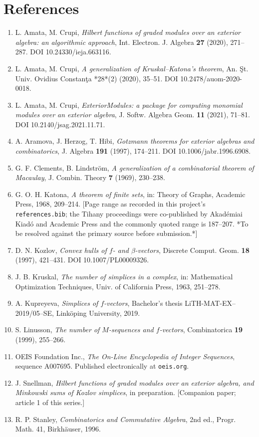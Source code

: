 \documentclass[11pt, a4paper, abstract=yes]{scrartcl}
\theoremstyle{definition}
\theoremstyle{remark}
\theoremstyle{plain}
\begin{document}
\section*{References}
\label{sec:org6385e97}
\begin{enumerate}
\item L. Amata, M. Crupi, \emph{Hilbert functions of graded modules over an exterior algebra: an algorithmic
approach}, Int. Electron. J. Algebra \textbf{27} (2020), 271--287. DOI 10.24330/ieja.663116.
\item L. Amata, M. Crupi, \emph{A generalization of Kruskal--Katona's theorem}, An. Şt. Univ. Ovidius
Constanţa *28*(2) (2020), 35--51. DOI 10.2478/auom-2020-0018.
\item L. Amata, M. Crupi, \emph{ExteriorModules: a package for computing monomial modules over an exterior
algebra}, J. Softw. Algebra Geom. \textbf{11} (2021), 71--81. DOI 10.2140/jsag.2021.11.71.
\item A. Aramova, J. Herzog, T. Hibi, \emph{Gotzmann theorems for exterior algebras and combinatorics},
J. Algebra \textbf{191} (1997), 174--211. DOI 10.1006/jabr.1996.6908.
\item G. F. Clements, B. Lindström, \emph{A generalization of a combinatorial theorem of Macaulay},
J. Combin. Theory \textbf{7} (1969), 230--238.
\item G. O. H. Katona, \emph{A theorem of finite sets}, in: Theory of Graphs, Academic Press, 1968,
209--214. [Page range as recorded in this project's \texttt{references.bib}; the Tihany proceedings were
co-published by Akadémiai Kiadó and Academic Press and the commonly quoted range is 187--207.
*To be resolved against the primary source before submission.*]
\item D. N. Kozlov, \emph{Convex hulls of \(f\)- and \(\beta\)-vectors}, Discrete Comput. Geom. \textbf{18} (1997),
421--431. DOI 10.1007/PL00009326.
\item J. B. Kruskal, \emph{The number of simplices in a complex}, in: Mathematical Optimization Techniques,
Univ. of California Press, 1963, 251--278.
\item A. Kupreyeva, \emph{Simplices of \(f\)-vectors}, Bachelor's thesis LiTH-MAT-EX--2019/05--SE,
Linköping University, 2019.
\item S. Linusson, \emph{The number of \(M\)-sequences and \(f\)-vectors}, Combinatorica \textbf{19} (1999),
255--266.
\item OEIS Foundation Inc., \emph{The On-Line Encyclopedia of Integer Sequences}, sequence A007695.
Published electronically at \texttt{oeis.org}.
\item J. Snellman, \emph{Hilbert functions of graded modules over an exterior algebra, and Minkowski
sums of Kozlov simplices}, in preparation. [Companion paper; article 1 of this series.]
\item R. P. Stanley, \emph{Combinatorics and Commutative Algebra}, 2nd ed., Progr. Math. 41,
Birkhäuser, 1996.
\end{enumerate}
\end{document}
